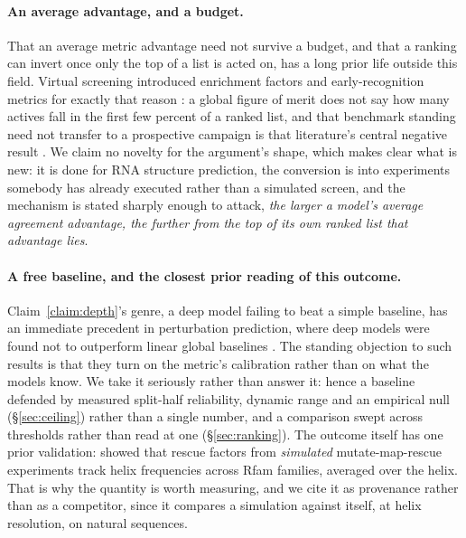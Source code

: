 \documentclass[11pt]{article}
\begin{document}
\paragraph{An average advantage, and a budget.} That an average metric advantage need not survive a
budget, and that a ranking can invert once only the top of a list is acted on, has a long prior
life outside this field. Virtual screening introduced enrichment factors and early-recognition
metrics for exactly that reason \citep{sheridan2001protocols,truchon2007evaluating}: a global
figure of merit does not say how many actives fall in the first few percent of a ranked list, and
that benchmark standing need not transfer to a prospective campaign is that literature's central
negative result \citep{wallach2018most}. We claim no novelty for the argument's shape, which makes
clear what is new: it is done for RNA structure prediction, the conversion is into experiments
somebody has already executed rather than a simulated screen, and the mechanism is stated sharply
enough to attack, \emph{the larger a model's average agreement advantage, the further from the top
of its own ranked list that advantage lies}.

\paragraph{A free baseline, and the closest prior reading of this outcome.}
Claim~\ref{claim:depth}'s genre, a deep model failing to beat a simple baseline, has an immediate
precedent in perturbation prediction, where deep models were found not to outperform linear global
baselines \citep{ahlmanneltze2025deep}. The standing objection to such results is that they turn
on the metric's calibration rather than on what the models know. We take it seriously rather than
answer it: hence a baseline defended by measured split-half reliability, dynamic range and an
empirical null (\S\ref{sec:ceiling}) rather than a single number, and a comparison swept across
thresholds rather than read at one (\S\ref{sec:ranking}). The outcome itself has one prior
validation: \citet{tian2018allosteric} showed that rescue factors from \emph{simulated}
mutate-map-rescue experiments track helix frequencies across Rfam families, averaged over the
helix. That is why the quantity is worth measuring, and we cite it as provenance rather than as a
competitor, since it compares a simulation against itself, at helix resolution, on natural
sequences.
\end{document}
